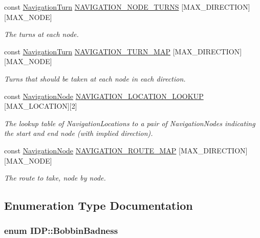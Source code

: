 \begin{DoxyCompactItemize}
const \hyperlink{namespaceIDP_ab8b8e9ff9f7de27da30c1fffaeef4b72}{NavigationTurn} \hyperlink{namespaceIDP_aa117cb76acf18e6af22830d5f2468ff4}{NAVIGATION\_\-NODE\_\-TURNS} \mbox{[}MAX\_\-DIRECTION\mbox{]}\mbox{[}MAX\_\-NODE\mbox{]}
\begin{DoxyCompactList}\small\item\em The turns at each node. \item\end{DoxyCompactList}\item 
const \hyperlink{namespaceIDP_ab8b8e9ff9f7de27da30c1fffaeef4b72}{NavigationTurn} \hyperlink{namespaceIDP_a0bada0608b684564e235786b3b38c10a}{NAVIGATION\_\-TURN\_\-MAP} \mbox{[}MAX\_\-DIRECTION\mbox{]}\mbox{[}MAX\_\-NODE\mbox{]}
\begin{DoxyCompactList}\small\item\em Turns that should be taken at each node in each direction. \item\end{DoxyCompactList}\item 
const \hyperlink{namespaceIDP_a286f26dda01010063dff761803b4cd16}{NavigationNode} \hyperlink{namespaceIDP_a33e1b72d66088b211bfeb61b18d7b63b}{NAVIGATION\_\-LOCATION\_\-LOOKUP} \mbox{[}MAX\_\-LOCATION\mbox{]}\mbox{[}2\mbox{]}
\begin{DoxyCompactList}\small\item\em The lookup table of NavigationLocations to a pair of NavigationNodes indicating the start and end node (with implied direction). \item\end{DoxyCompactList}\item 
const \hyperlink{namespaceIDP_a286f26dda01010063dff761803b4cd16}{NavigationNode} \hyperlink{namespaceIDP_a33ba7fcc78e0c8e5477d2ed6ac18e48f}{NAVIGATION\_\-ROUTE\_\-MAP} \mbox{[}MAX\_\-DIRECTION\mbox{]}\mbox{[}MAX\_\-NODE\mbox{]}
\begin{DoxyCompactList}\small\item\em The route to take, node by node. \item\end{DoxyCompactList}\end{DoxyCompactItemize}


\subsection{Enumeration Type Documentation}
\hypertarget{namespaceIDP_adf12b2c1e1c228810b18c34a3c88c32d}{
\subsubsection[{BobbinBadness}]{\setlength{\rightskip}{0pt plus 5cm}enum {\bf IDP::BobbinBadness}}}
\label{namespaceIDP_adf12b2c1e1c228810b18c34a3c88c32d}


